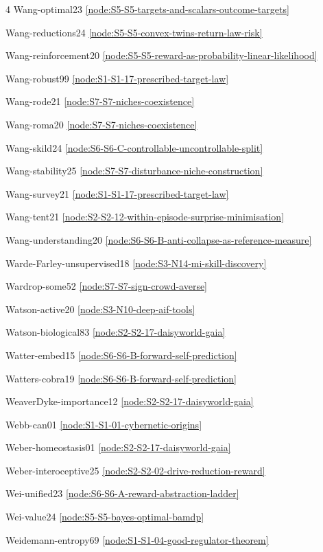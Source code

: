 \documentclass[10pt]{article}
\begin{document}
{\begin{multicols}{4}
Wang-optimal23 \hfill \ref{node:S5-S5-targets-and-scalars-outcome-targets}\par
Wang-reductions24 \hfill \ref{node:S5-S5-convex-twins-return-law-risk}\par
Wang-reinforcement20 \hfill \ref{node:S5-S5-reward-as-probability-linear-likelihood}\par
Wang-robust99 \hfill \ref{node:S1-S1-17-prescribed-target-law}\par
Wang-rode21 \hfill \ref{node:S7-S7-niches-coexistence}\par
Wang-roma20 \hfill \ref{node:S7-S7-niches-coexistence}\par
Wang-skild24 \hfill \ref{node:S6-S6-C-controllable-uncontrollable-split}\par
Wang-stability25 \hfill \ref{node:S7-S7-disturbance-niche-construction}\par
Wang-survey21 \hfill \ref{node:S1-S1-17-prescribed-target-law}\par
Wang-tent21 \hfill \ref{node:S2-S2-12-within-episode-surprise-minimisation}\par
Wang-understanding20 \hfill \ref{node:S6-S6-B-anti-collapse-as-reference-measure}\par
Warde-Farley-unsupervised18 \hfill \ref{node:S3-N14-mi-skill-discovery}\par
Wardrop-some52 \hfill \ref{node:S7-S7-sign-crowd-averse}\par
Watson-active20 \hfill \ref{node:S3-N10-deep-aif-tools}\par
Watson-biological83 \hfill \ref{node:S2-S2-17-daisyworld-gaia}\par
Watter-embed15 \hfill \ref{node:S6-S6-B-forward-self-prediction}\par
Watters-cobra19 \hfill \ref{node:S6-S6-B-forward-self-prediction}\par
WeaverDyke-importance12 \hfill \ref{node:S2-S2-17-daisyworld-gaia}\par
Webb-can01 \hfill \ref{node:S1-S1-01-cybernetic-origins}\par
Weber-homeostasis01 \hfill \ref{node:S2-S2-17-daisyworld-gaia}\par
Weber-interoceptive25 \hfill \ref{node:S2-S2-02-drive-reduction-reward}\par
Wei-unified23 \hfill \ref{node:S6-S6-A-reward-abstraction-ladder}\par
Wei-value24 \hfill \ref{node:S5-S5-bayes-optimal-bamdp}\par
Weidemann-entropy69 \hfill \ref{node:S1-S1-04-good-regulator-theorem}\par

\end{multicols}}
\end{document}
